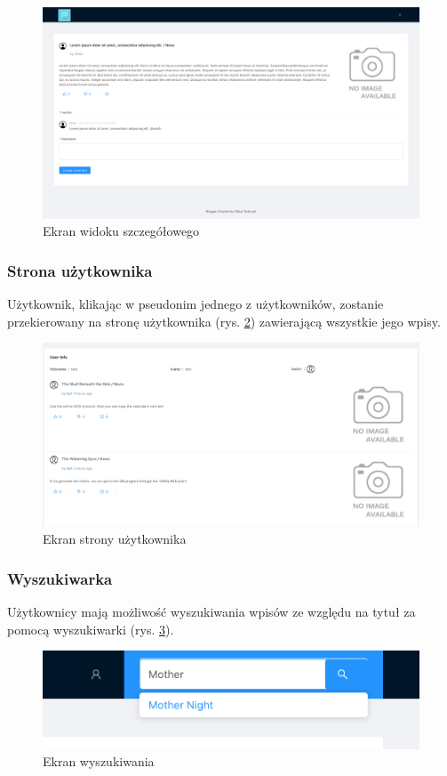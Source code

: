 \documentclass[declaration,shortabstract,polish,inz]{iithesis}
\begin{document}
\begin{figure}[H]
    \centering
    \includegraphics[width=\textwidth]{images/widok_postu.png}
    \caption{Ekran widoku szczegółowego}
    \label{fig:post_view}
\end{figure}
\subsubsection{Strona użytkownika}
Użytkownik, klikając w pseudonim jednego z użytkowników, zostanie przekierowany na stronę użytkownika (rys. \ref{fig:uzytkownik}) zawierającą wszystkie jego wpisy.

\begin{figure}[H]
    \centering
    \includegraphics[width=\textwidth]{images/stronauzytkownika.png} 
    \caption{Ekran strony użytkownika}
    \label{fig:uzytkownik}
\end{figure}
\subsubsection{Wyszukiwarka}
Użytkownicy mają możliwość wyszukiwania wpisów ze względu na tytuł za pomocą wyszukiwarki (rys. \ref{fig:wyszukiwarka}).
\begin{figure}[H]
    \centering
    \includegraphics[width=\textwidth]{images/wyszukiwarka.png}
    \caption{Ekran wyszukiwania}
    \label{fig:wyszukiwarka}
\end{figure}
\end{document}
